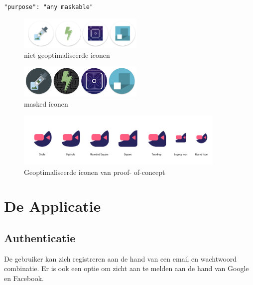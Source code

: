 \begin{lstlisting}
"purpose": "any maskable" 
\end{lstlisting}

		\begin{figure}[H]
			\centering
			\includegraphics[width=60mm]{./img/traditionalIcons}{}
			\caption{niet geoptimaliseerde iconen}
		\end{figure}
		\begin{figure}[H]
			\centering
			\includegraphics[width=60mm]{./img/maskedicons}{}
			\caption{masked iconen}
		\end{figure}
		\begin{figure}[H]
			\centering
			\includegraphics[width=100mm]{./img/iconPWA.png}{}
			\caption{Geoptimaliseerde iconen van proof- of-concept}
		\end{figure}


\section{De Applicatie}
	\subsection{Authenticatie}
		De gebruiker kan zich registreren aan de hand van een email en wachtwoord combinatie. Er is ook een optie om zicht aan te melden aan de hand van Google en Facebook.
		

